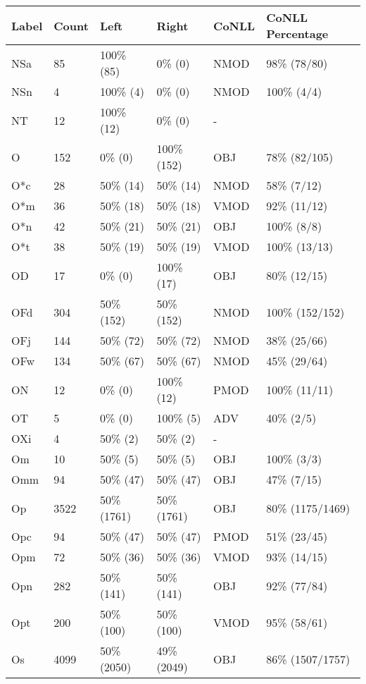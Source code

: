 \begin{figure*}
\begin{tabular}{|l|l|l|l||l|l|}
\hline
Label & Count & Left & Right & CoNLL & CoNLL Percentage\\ 
\hline
 NSa & 85 & 100\% (85) & 0\% (0) & NMOD & 98\% (78/80) \\ 
\hline
 NSn & 4 & 100\% (4) & 0\% (0) & NMOD & 100\% (4/4) \\ 
\hline
 NT & 12 & 100\% (12) & 0\% (0) & - &  \\ 
\hline
 O & 152 & 0\% (0) & 100\% (152) & OBJ & 78\% (82/105) \\ 
\hline
 O*c & 28 & 50\% (14) & 50\% (14) & NMOD & 58\% (7/12) \\ 
\hline
 O*m & 36 & 50\% (18) & 50\% (18) & VMOD & 92\% (11/12) \\ 
\hline
 O*n & 42 & 50\% (21) & 50\% (21) & OBJ & 100\% (8/8) \\ 
\hline
 O*t & 38 & 50\% (19) & 50\% (19) & VMOD & 100\% (13/13) \\ 
\hline
 OD & 17 & 0\% (0) & 100\% (17) & OBJ & 80\% (12/15) \\ 
\hline
 OFd & 304 & 50\% (152) & 50\% (152) & NMOD & 100\% (152/152) \\ 
\hline
 OFj & 144 & 50\% (72) & 50\% (72) & NMOD & 38\% (25/66) \\ 
\hline
 OFw & 134 & 50\% (67) & 50\% (67) & NMOD & 45\% (29/64) \\ 
\hline
 ON & 12 & 0\% (0) & 100\% (12) & PMOD & 100\% (11/11) \\ 
\hline
 OT & 5 & 0\% (0) & 100\% (5) & ADV & 40\% (2/5) \\ 
\hline
 OXi & 4 & 50\% (2) & 50\% (2) & - &  \\ 
\hline
 Om & 10 & 50\% (5) & 50\% (5) & OBJ & 100\% (3/3) \\ 
\hline
 Omm & 94 & 50\% (47) & 50\% (47) & OBJ & 47\% (7/15) \\ 
\hline
 Op & 3522 & 50\% (1761) & 50\% (1761) & OBJ & 80\% (1175/1469) \\ 
\hline
 Opc & 94 & 50\% (47) & 50\% (47) & PMOD & 51\% (23/45) \\ 
\hline
 Opm & 72 & 50\% (36) & 50\% (36) & VMOD & 93\% (14/15) \\ 
\hline
 Opn & 282 & 50\% (141) & 50\% (141) & OBJ & 92\% (77/84) \\ 
\hline
 Opt & 200 & 50\% (100) & 50\% (100) & VMOD & 95\% (58/61) \\ 
\hline
 Os & 4099 & 50\% (2050) & 49\% (2049) & OBJ & 86\% (1507/1757) \\ 

\end{tabular}
\end{figure*}
